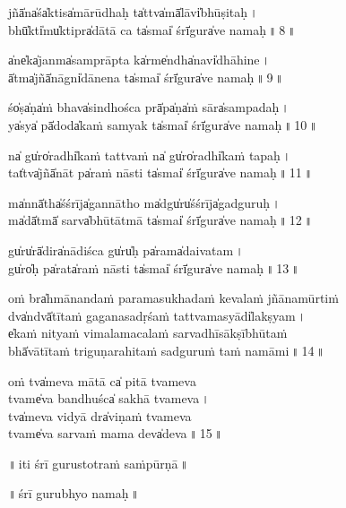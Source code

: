 \documentclass[parskip, DIV=14]{scrartcl}
\begin{document}
jñā̍na̍śa̍ktisa̍mārū॒dhaḥ ta̍ttva̍mā̍lāvi̍bhūṣi॒ta॒ḥ\,। \\
bhū̍kti̍mu̍ktipra̍dātā॒ ca  ta̍smai̍ śrī̍gura̍ve na॒ma॒ḥ॒\,॥\,8\,॥ \par 

a̍ne̍ka̍janma̍samprā॒pta ka̍rme̍ndha̍navi̍dhāhi॒ne॒\,। \\
ā̍tma̍jñā̍nāgni̍dāne॒na  ta̍smai̍ śrī̍gura̍ve na॒ma॒ḥ॒\,॥\,9\,॥ \par 

śo̍ṣa̍ṇa̍ṁ bhava̍sindho॒śca prā̍pa̍ṇa̍ṁ sāra̍sampa॒da॒ḥ\,। \\
ya̍sya̍ pā̍doda̍kaṁ sa॒myak  ta̍smai̍ śrī̍gura̍ve na॒ma॒ḥ॒\,॥\,10\,॥ \par 

na̍ gu̍ro̍radhi̍kaṁ ta॒ttvaṁ na̍ gu̍ro̍radhi̍kaṁ ta॒pa॒ḥ\,। \\
tat̍tva̍jñā̍nāt pa̍raṁ nā॒sti ta̍smai̍ śrī̍gura̍ve na॒ma॒ḥ॒\,॥\,11\,॥ \par 

ma̍nnā̍tha̍śśrīja̍gannā॒tho ma̍dgu̍ru̍śśrīja̍gadgu॒ru॒ḥ॒\,। \\
ma̍dā̍tmā̍ sarva̍bhūtā॒tmā  ta̍smai̍ śrī̍gura̍ve na॒ma॒ḥ॒\,॥\,12\,॥ \par 

gu̍ru̍rā̍dira̍nādi॒śca gu̍ru̍ḥ pa̍rama̍daiva॒ta॒m\,। \\
gu̍ro̍ḥ pa̍rata̍raṁ nā॒sti   ta̍smai̍ śrī̍gura̍ve na॒ma॒ḥ॒\,॥\,13\,॥ \par 

\vspace{1cm}

oṁ bra̍hmānandaṁ paramasukhadaṁ ke॒va॒laṁ jñā॒namū॒rtiṁ  \\
dva̍ndvā̍tītaṁ gaganasadṛśaṁ ta॒ttvama॒syādi̍lakṣya॒m\,। \\
e̍kaṁ nityaṁ vimalamacalaṁ sa॒rvadhī॒sākṣībhū॒taṁ  \\
bhā̍vātītaṁ triguṇarahitaṁ sa॒dguruṁ taṁ na॒māmi॒\,॥\,14\,॥ \par 
\vspace{1cm}

oṁ tva̍meva mātā ca̍ pi॒tā tvame॒va \\
tva॒me̍va bandhuśca̍ sa॒khā tvameva॒\,। \\ 
tva̍meva vidyā dra̍vi॒ṇaṁ tvame॒va \\
tva॒me̍va sarvaṁ ma॒ma॒ deva̍deva॒\,॥\,15\,॥ \par 

\vspace{1cm}
 
\begin{center}
 ॥\,iti śrī gu॒rustotraṁ saṁpū॒rṇā\,॥

\vspace{1cm}

॥\,śrī gu॒ru॒bhyo na॒ma॒ḥ॒\,॥

\end{center}
\end{document}

